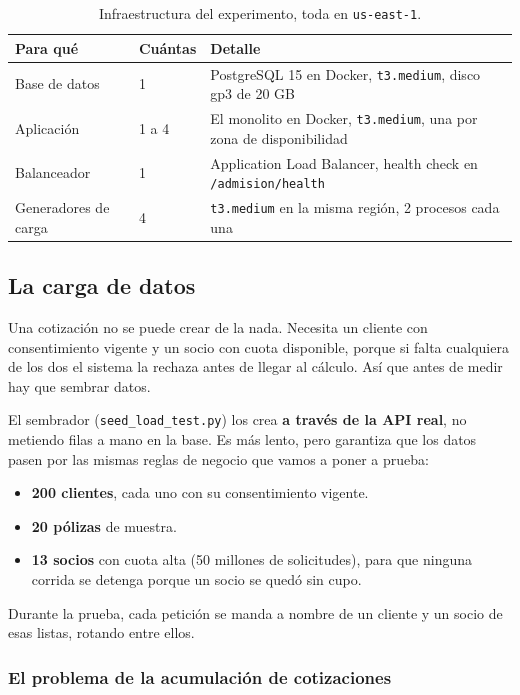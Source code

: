 \documentclass[11pt]{article}
\begin{document}
\begin{table}[H]
\centering
\begin{tabular}{L{4.5cm} L{2cm} L{9cm}}
\toprule
Para qué & Cuántas & Detalle \\
\midrule
Base de datos & 1 & PostgreSQL 15 en Docker, \texttt{t3.medium}, disco gp3 de 20 GB \\
Aplicación & 1 a 4 & El monolito en Docker, \texttt{t3.medium}, una por zona de disponibilidad \\
Balanceador & 1 & Application Load Balancer, health check en \texttt{/admision/health} \\
Generadores de carga & 4 & \texttt{t3.medium} en la misma región, 2 procesos cada una \\
\bottomrule
\end{tabular}
\caption{Infraestructura del experimento, toda en \texttt{us-east-1}.}
\end{table}


\subsection{La carga de datos}

Una cotización no se puede crear de la nada. Necesita un cliente con consentimiento vigente y un
socio con cuota disponible, porque si falta cualquiera de los dos el sistema la rechaza antes de
llegar al cálculo. Así que antes de medir hay que sembrar datos.

El sembrador (\texttt{seed\_load\_test.py}) los crea \textbf{a través de la API real}, no metiendo
filas a mano en la base. Es más lento, pero garantiza que los datos pasen por las mismas reglas de
negocio que vamos a poner a prueba:

\begin{itemize}
  \item \textbf{200 clientes}, cada uno con su consentimiento vigente.
  \item \textbf{20 pólizas} de muestra.
  \item \textbf{13 socios} con cuota alta (50 millones de solicitudes), para que ninguna corrida se
        detenga porque un socio se quedó sin cupo.
\end{itemize}

Durante la prueba, cada petición se manda a nombre de un cliente y un socio de esas listas, rotando
entre ellos.

\subsubsection{El problema de la acumulación de cotizaciones}
\end{document}
